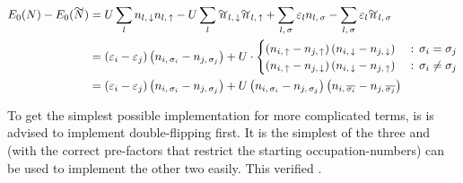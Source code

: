 \begin{equation}
    \label{eq:simplified-base-energy-hopping}
    \begin{split}
        E_0(N)-E_0(\vphantom{N}\smash{\tilde{N}}) 
        & = U\lsum n_{l,\,\down}n_{l,\,\up}-U\lsum \tilde{n}_{l,\,\down}\tilde{n}_{l,\,\up} 
        + \lsum[l,\,\sigma] \epsl n_{l,\,\sigma} - \lsum[l,\,\sigma] \epsl \tilde{n}_{l,\,\sigma}\\
        & =  \left(\epsl[i]-\epsl[j]\right)\left(n_{i,\,\sigma_i} - n_{j,\,\sigma_j}\right) +
        U\cdot \begin{cases}
            \left(n_{i,\,\up}-n_{j,\,\up}\right) \left(n_{i,\,\down}-n_{j,\,\down}\right) &\text{ : } \sigma_i = \sigma_j   \\
            \left(n_{i,\,\up}-n_{j,\,\down}\right) \left(n_{i,\,\down}-n_{j,\,\up}\right) &\text{ : } \sigma_i \neq \sigma_j
        \end{cases}\\
        & = \left(\epsl[i]-\epsl[j]\right)\left(n_{i,\,\sigma_i} - n_{j,\,\sigma_j}\right) +
        U \left(n_{i,\,\sigma_i}-n_{j,\,\sigma_j}\right) \left(n_{i,\,\overline{\sigma_i}}-n_{j,\,\overline{\sigma_j}}\right)
    \end{split}
\end{equation}

To get the simplest possible implementation for more complicated terms, is is advised to implement double-flipping first.
It is the simplest of the three and (with the correct pre-factors that restrict the starting occupation-numbers) can be used to implement the other two easily.
This verified .